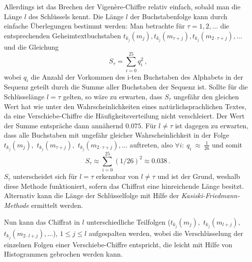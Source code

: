 Allerdings ist das Brechen der Vigen\`ere-Chiffre relativ einfach, sobald man die Länge $l$ des Schlüssels kennt. Die Länge $l$ der Buchstabenfolge kann durch einfache Überlegungen bestimmt werden: Man betrachte für $\tau = 1,2,\ldots$ die entsprechenden Geheimtextbuchstaben $t_{k_j}(m_j),t_{k_j}(m_{\tau+j}),t_{k_j}(m_{2 \cdot \tau+j}),\ldots$ und die Gleichung
\begin{equation*}
	S_{\tau}=	\sum_{i=0}^{25} q^2_i \, \text{,}
\end{equation*}
wobei $q_i$ die Anzahl der Vorkommen des i-ten Buchstaben des Alphabets in der Sequenz geteilt durch die Summe aller Buchstaben der Sequenz ist. Sollte für die
Schlüsselänge $l = \tau$ gelten, so wäre zu erwarten, dass $S_{\tau}$ ungefähr den gleichen Wert hat wie unter den Wahrscheinlichkeiten eines
natürlichsprachlichen Textes, da eine Verschiebe-Chiffre die Häufigkeitsverteilung nicht verschleiert. Der Wert der Summe entspräche dann annähernd $0.075$.
Für $l \neq \tau$ ist dagegen zu erwarten, dass alle Buchstaben mit ungefähr gleicher Wahrscheinlichkeit in der Folge $t_{k_j}(m_j),$ $t_{k_j}(m_{\tau+j}),$ $t_{k_j}(m_{2 \cdot \tau+j}),\ldots$ auftreten, also $\forall i\colon~q_i~\approx~\frac{1}{26}$ und somit
\begin{equation*}
	S_{\tau} \approx \sum_{i=0}^{25} (1/26)^2 \approx 0.038 \,\text{.}
\end{equation*}
$S_{\tau}$ unterscheidet sich für $l = \tau$ erkennbar von $l \neq \tau$ und ist der Grund, weshalb diese Methode funktioniert, sofern das Chiffrat eine hinreichende Länge besitzt. Alternativ kann die Länge der Schlüsselfolge mit Hilfe der \emph{Kasiski-Friedmann-Methode} ermittelt werden. %

Nun kann das Chiffrat in $l$ unterschiedliche Teilfolgen ($t_{k_j}(m_j),$ $t_{k_j}(m_{l+j}),$ $t_{k_j}(m_{2 \cdot l+j}),\ldots$), $1 \leq j \leq l$ aufgespalten werden, wobei die Verschlüsselung der einzelnen Folgen einer Verschiebe-Chiffre entspricht, die leicht mit Hilfe von Histogrammen gebrochen werden kann.

